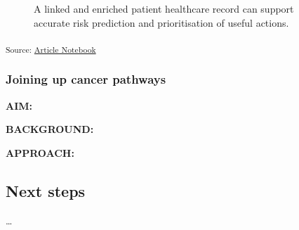 \documentclass[
  letterpaper,
  DIV=11,
  numbers=noendperiod]{scrartcl}
\begin{document}
\begin{figure}


\caption{\label{fig-patient-dec-int}A linked and enriched patient
healthcare record can support accurate risk prediction and
prioritisation of useful actions.}

\end{figure}%

\textsubscript{Source:
\href{https://d3london.github.io/sde_aic_docs/index.qmd.html}{Article
Notebook}}

\subsubsection{Joining up cancer
pathways}\label{joining-up-cancer-pathways}

\textbf{AIM:}

\textbf{BACKGROUND:}

\textbf{APPROACH:}

\subsection{Next steps}\label{next-steps}

\ldots{}
\end{document}
